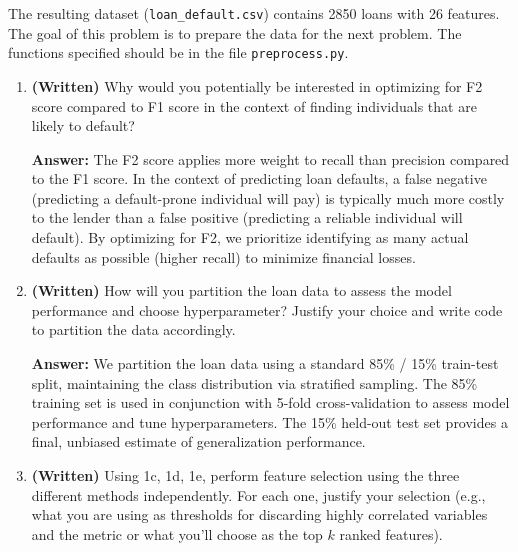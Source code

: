 \documentclass[11pt]{article}
\begin{document}
The resulting dataset (\texttt{loan\_default.csv}) contains 2850 loans with 26 features. The goal of this problem is to prepare the data for the next problem. The functions specified should be in the file \texttt{preprocess.py}.

\begin{enumerate}[label=(\alph*)]
    \item \textbf{(Written)} Why would you potentially be interested in optimizing for F2 score compared to F1 score in the context of finding individuals that are likely to default?
    
    \textbf{Answer:} The F2 score applies more weight to recall than precision compared to the F1 score. In the context of predicting loan defaults, a false negative (predicting a default-prone individual will pay) is typically much more costly to the lender than a false positive (predicting a reliable individual will default). By optimizing for F2, we prioritize identifying as many actual defaults as possible (higher recall) to minimize financial losses.

    \item \textbf{(Written)} How will you partition the loan data to assess the model performance and choose hyperparameter? Justify your choice and write code to partition the data accordingly.
    
    \textbf{Answer:} We partition the loan data using a standard 85\% / 15\% train-test split, maintaining the class distribution via stratified sampling. The 85\% training set is used in conjunction with 5-fold cross-validation to assess model performance and tune hyperparameters. The 15\% held-out test set provides a final, unbiased estimate of generalization performance.

    \item[(f)] \textbf{(Written)} Using 1c, 1d, 1e, perform feature selection using the three different methods independently. For each one, justify your selection (e.g., what you are using as thresholds for discarding highly correlated variables and the metric or what you'll choose as the top $k$ ranked features).
    

\end{enumerate}
\end{document}
